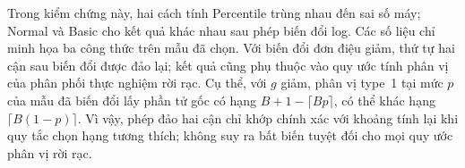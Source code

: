 Trong kiểm chứng này, hai cách tính Percentile trùng nhau đến sai số máy;
Normal và Basic cho kết quả khác nhau sau phép biến đổi log. Các số liệu
chỉ minh họa ba công thức trên mẫu đã chọn. Với biến đổi đơn điệu giảm,
thứ tự hai cận sau biến đổi được đảo lại; kết quả cũng phụ thuộc vào quy
ước tính phân vị của phân phối thực nghiệm rời rạc. Cụ thể, với $g$ giảm, phân vị type~1 tại mức $p$ của mẫu đã biến đổi lấy phần tử gốc có hạng $B+1-\lceil Bp\rceil$, có thể khác hạng $\lceil B(1-p)\rceil$. Vì vậy, phép đảo hai cận chỉ khớp chính xác với khoảng tính lại khi quy tắc chọn hạng tương thích; không suy ra bất biến tuyệt đối cho mọi quy ước phân vị rời rạc.

